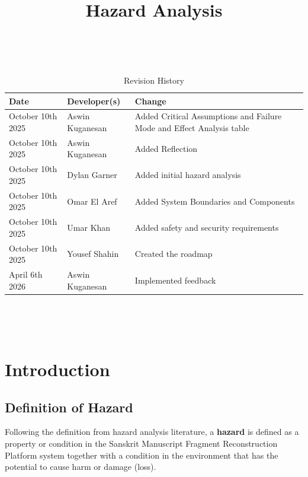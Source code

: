 \documentclass{article}
\title{Hazard Analysis\\\progname}
\author{\authname}
\date{}
\begin{document}
\maketitle
\thispagestyle{empty}

~\newpage


\begin{table}[hp]
\caption{Revision History} \label{TblRevisionHistory}
\begin{tabularx}{\textwidth}{llX}
\toprule
\textbf{Date} & \textbf{Developer(s)} & \textbf{Change}\\
\midrule
October 10th 2025 & Aswin Kuganesan & Added Critical Assumptions and Failure Mode and Effect Analysis table\\
October 10th 2025 & Aswin Kuganesan & Added Reflection\\
October 10th 2025 & Dylan Garner & Added initial hazard analysis\\
October 10th 2025 & Omar El Aref & Added System Boundaries and Components\\
October 10th 2025 & Umar Khan & Added safety and security requirements\\
October 10th 2025 & Yousef Shahin & Created the roadmap\\
April 6th 2026 & Aswin Kuganesan & Implemented feedback\\

\bottomrule
\end{tabularx}
\end{table}

~\newpage

\tableofcontents
\listoftables

~\newpage



\section{Introduction}

\subsection{Definition of Hazard}

Following the definition from hazard analysis literature, a \textbf{hazard} is defined as a property or condition in the Sanskrit Manuscript Fragment Reconstruction Platform system together with a condition in the environment that has the potential to cause harm or damage (loss).
\end{document}
